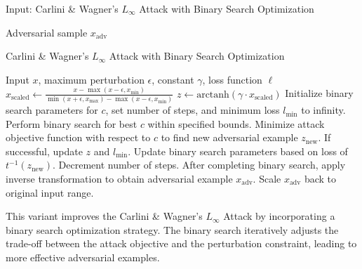 Input: Carlini & Wagner's $L_{\infty}$ Attack with Binary Search Optimization

Adversarial sample $x_{\text{adv}}$

\begin{algorithm}
\caption{Carlini \& Wagner's $L_{\infty}$ Attack with Binary Search Optimization}
\begin{algorithmic}[1]
\REQUIRE Input $x$, maximum perturbation $\epsilon$, constant $\gamma$, loss function $\ell$
\STATE $x_{\text{scaled}} \leftarrow \frac{x - \max(x - \epsilon, x_{\text{min}})}{\min(x + \epsilon, x_{\text{max}}) - \max(x - \epsilon, x_{\text{min}})}$
\STATE $z \leftarrow \text{arctanh}(\gamma \cdot x_{\text{scaled}})$
\STATE Initialize binary search parameters for $c$, set number of steps, and minimum loss $l_{\text{min}}$ to infinity.
\STATE Perform binary search for best $c$ within specified bounds.
\STATE Minimize attack objective function with respect to $c$ to find new adversarial example $z_{\text{new}}$.
\STATE If successful, update $z$ and $l_{\text{min}}$. Update binary search parameters based on loss of $t^{-1}(z_{\text{new}})$.
\STATE Decrement number of steps. After completing binary search, apply inverse transformation to obtain adversarial example $x_{\text{adv}}$.
\STATE Scale $x_{\text{adv}}$ back to original input range.
\end{algorithmic}
\end{algorithm}

This variant improves the Carlini & Wagner's $L_{\infty}$ Attack by incorporating a binary search optimization strategy. The binary search iteratively adjusts the trade-off between the attack objective and the perturbation constraint, leading to more effective adversarial examples.